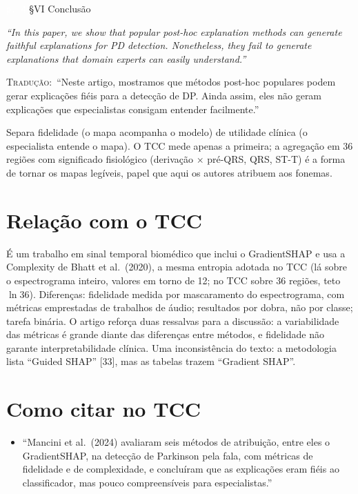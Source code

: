 \documentclass[11pt,a4paper]{article}
\newcommand{\pagechip}[1]{{\setlength{\fboxsep}{1.5pt}\colorbox{cAcc}{\textcolor{white}{\scriptsize\texttt{#1}}}}}
\newenvironment{origquote}{\par\itshape\small}{\par}
\newenvironment{tradquote}{\par\small\textsc{Tradução:}\ }{\par}
\newcommand{\explab}[1]{\par\smallskip{\small\color{cAcc}\textbf{\MakeUppercase{#1}}}\par}
\begin{document}
\begin{citacard}{\pagechip{p. 4} §VI Conclusão}
\begin{origquote}“In this paper, we show that popular post-hoc explanation methods can generate faithful explanations for PD detection. Nonetheless, they fail to generate explanations that domain experts can easily understand.”\end{origquote}
\begin{tradquote}“Neste artigo, mostramos que métodos post-hoc populares podem gerar explicações fiéis para a detecção de DP. Ainda assim, eles não geram explicações que especialistas consigam entender facilmente.”\end{tradquote}
\explab{Explicação}
Separa fidelidade (o mapa acompanha o modelo) de utilidade clínica (o especialista entende o mapa). O TCC mede apenas a primeira; a agregação em 36 regiões com significado fisiológico (derivação $\times$ pré-QRS, QRS, ST-T) é a forma de tornar os mapas legíveis, papel que aqui os autores atribuem aos fonemas.
\end{citacard}

\section{Relação com o TCC}
É um trabalho em sinal temporal biomédico que inclui o GradientSHAP e usa a Complexity de Bhatt et al.\ (2020), a mesma entropia adotada no TCC (lá sobre o espectrograma inteiro, valores em torno de 12; no TCC sobre 36 regiões, teto $\ln 36$). Diferenças: fidelidade medida por mascaramento do espectrograma, com métricas emprestadas de trabalhos de áudio; resultados por dobra, não por classe; tarefa binária. O artigo reforça duas ressalvas para a discussão: a variabilidade das métricas é grande diante das diferenças entre métodos, e fidelidade não garante interpretabilidade clínica. Uma inconsistência do texto: a metodologia lista “Guided SHAP” [33], mas as tabelas trazem “Gradient SHAP”.

\section{Como citar no TCC}
\begin{itemize}
\item “Mancini et al.\ (2024) avaliaram seis métodos de atribuição, entre eles o GradientSHAP, na detecção de Parkinson pela fala, com métricas de fidelidade e de complexidade, e concluíram que as explicações eram fiéis ao classificador, mas pouco compreensíveis para especialistas.”
\end{itemize}
\end{document}

